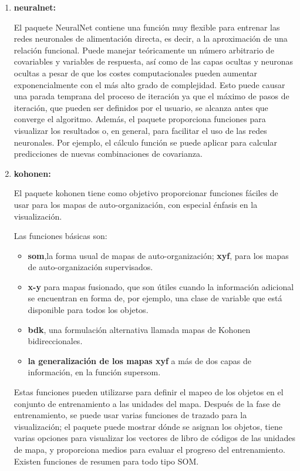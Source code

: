 \documentclass[journal]{IEEEtran}
\begin{document}
\begin{enumerate}
\item \textbf{neuralnet:}

El paquete NeuralNet contiene una función muy flexible para entrenar las redes neuronales de alimentación directa, es decir, a la aproximación de una relación funcional. Puede manejar teóricamente un número arbitrario de covariables y variables de respuesta, así como de las capas ocultas y neuronas ocultas a pesar de que los costes computacionales pueden aumentar exponencialmente con el más alto grado de complejidad. Esto puede causar una parada temprana del proceso de iteración ya que el máximo de pasos de iteración, que pueden ser definidos por el usuario, se alcanza antes que converge el algoritmo. Además, el paquete proporciona funciones para visualizar los resultados o, en general, para facilitar el uso de las redes neuronales. Por ejemplo, el cálculo función se puede aplicar para calcular predicciones de nuevas combinaciones de covarianza.\\

\item \textbf{kohonen:}

El paquete kohonen tiene como objetivo proporcionar funciones fáciles de usar para los mapas de auto-organización, con especial énfasis en la visualización.

Las funciones básicas son:

\begin{itemize}
\item \textbf{som},la forma usual de mapas de auto-organización; \textbf{xyf}, para los mapas de auto-organización supervisados.

\item \textbf{x-y} para mapas fusionado, que son útiles cuando la información adicional se encuentran en forma de, por ejemplo, una clase de variable que está disponible para todos los objetos.

\item \textbf{bdk}, una formulación alternativa llamada mapas de Kohonen bidireccionales.

\item \textbf{la generalización de los mapas xyf} a más de dos capas de información, en la función supersom.
\end{itemize}

Estas funciones pueden utilizarse para definir el mapeo de los objetos en el conjunto de entrenamiento a las unidades del mapa. Después de la fase de entrenamiento, se puede usar varias funciones de trazado para la visualización; el paquete puede mostrar dónde se asignan los objetos, tiene varias opciones para visualizar los vectores de libro de códigos de las unidades de mapa, y proporciona medios para evaluar el progreso del entrenamiento. Existen funciones de resumen para todo tipo SOM.
\end{enumerate}
\end{document}

